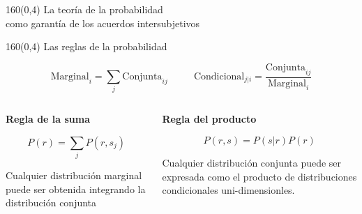 \documentclass[shownotes,aspectratio=169]{beamer}
\begin{document}
\begin{frame}[plain]
\begin{textblock}{160}(0,4)
\centering \LARGE La teoría de la probabilidad \\ \Large como garantía de los acuerdos intersubjetivos
\end{textblock}
\vspace{0.75cm}


\end{frame}

\begin{frame}[plain]
\begin{textblock}{160}(0,4)
\centering \LARGE  Las reglas de la probabilidad
\end{textblock}

\vspace{0.75cm}



\begin{equation*}
  \text{Marginal}_{i} = \sum_j \text{Conjunta}_{ij}  \ \ \ \ \ \ \ \ \ \ \ \  \text{Condicional}_{j|i} = \frac{\text{Conjunta}_{ij}}{\text{Marginal}_{i}}
\end{equation*}

\pause
\vspace{0.75cm}


\begin{columns}[t]
\begin{column}{0.5\textwidth}
 \centering \textbf{Regla de la suma}
 
 
\begin{equation*}
 P(r) = \sum_j P(r,s_j)
\end{equation*}
 
 \justifying \footnotesize
  Cualquier distribución marginal puede ser obtenida integrando la distribución conjunta

 \end{column}
 \begin{column}{0.5\textwidth}
\centering  \textbf{Regla del producto}

\begin{equation*}
 P(r,s) = P(s|r) P(r)
\end{equation*}

 \justifying \footnotesize
Cualquier distribución conjunta puede ser expresada como el producto de distribuciones condicionales uni-dimensionles.

\end{column}
\end{columns}

\end{frame}
 
\end{document}
